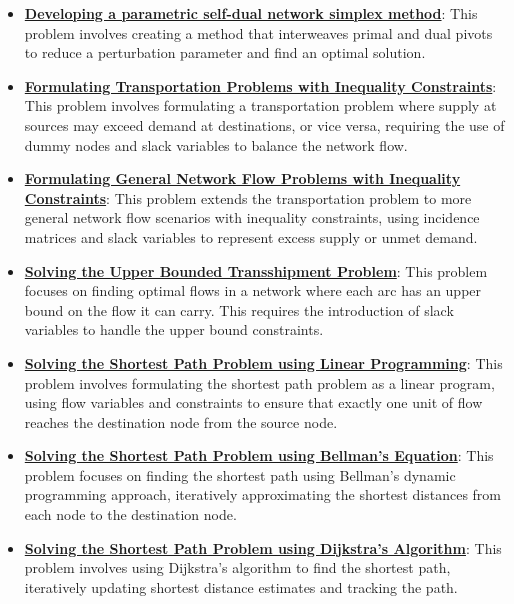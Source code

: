 \documentclass{article}%
\begin{document}
\begin{itemize}[leftmargin=*]
\item \href{https://www.math.purdue.edu/~yipn/421//2024-11-07-NetSimplex.pdf#page=45}{\textbf{Developing a parametric self-dual network simplex method}}: This problem involves creating a method that interweaves primal and dual pivots to reduce a perturbation parameter and find an optimal solution.%
\item \href{https://www.math.purdue.edu/~yipn/421//2024-11-14-NetAppls.pdf#page=2}{\textbf{Formulating Transportation Problems with Inequality Constraints}}: This problem involves formulating a transportation problem where supply at sources may exceed demand at destinations, or vice versa, requiring the use of dummy nodes and slack variables to balance the network flow.%
\item \href{https://www.math.purdue.edu/~yipn/421//2024-11-14-NetAppls.pdf#page=7}{\textbf{Formulating General Network Flow Problems with Inequality Constraints}}: This problem extends the transportation problem to more general network flow scenarios with inequality constraints, using incidence matrices and slack variables to represent excess supply or unmet demand.%
\item \href{https://www.math.purdue.edu/~yipn/421//2024-11-14-NetAppls.pdf#page=9}{\textbf{Solving the Upper Bounded Transshipment Problem}}: This problem focuses on finding optimal flows in a network where each arc has an upper bound on the flow it can carry.  This requires the introduction of slack variables to handle the upper bound constraints.%
\item \href{https://www.math.purdue.edu/~yipn/421//2024-11-14-NetAppls.pdf#page=13}{\textbf{Solving the Shortest Path Problem using Linear Programming}}: This problem involves formulating the shortest path problem as a linear program, using flow variables and constraints to ensure that exactly one unit of flow reaches the destination node from the source node.%
\item \href{https://www.math.purdue.edu/~yipn/421//2024-11-14-NetAppls.pdf#page=16}{\textbf{Solving the Shortest Path Problem using Bellman's Equation}}: This problem focuses on finding the shortest path using Bellman's dynamic programming approach, iteratively approximating the shortest distances from each node to the destination node.%
\item \href{https://www.math.purdue.edu/~yipn/421//2024-11-14-NetAppls.pdf#page=20}{\textbf{Solving the Shortest Path Problem using Dijkstra's Algorithm}}: This problem involves using Dijkstra's algorithm to find the shortest path, iteratively updating shortest distance estimates and tracking the path.%

\end{itemize}
\end{document}
